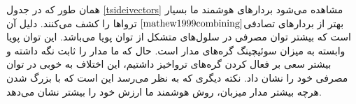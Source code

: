 \vspace{1cm}


همان طور که در جدول \ref{tsideivectors} مشاهده می‌شود بردارهای هوشمند ما بسیار بهتر از بردارهای تصادفی$\cite{mathew1999combining}$ تروا‌ها را کشف می‌کنند. دلیل آن است که بیشتر توان مصرفی در سلول‌های
متشکل از توان پویا می‌باشد. این توان پویا وابسته به میزان سوئیچینگ گره‌های مدار است. حال که ما مدار را ثابت نگه داشته و بیشتر سعی بر فعال کردن گره‌های تروا‌خیز داشتیم، این اختلاف به خوبی در توان مصرفی خود را نشان داد. نکته دیگری که به نظر می‌رسد این است که با بزرگ شدن هرچه بیشتر مدار میزبان، روش هوشمند ما ارزش خود را بیشتر نشان می‌دهد.





